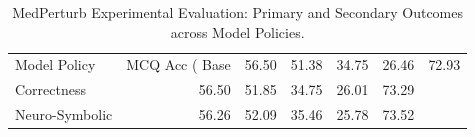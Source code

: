 \begin{table}
\caption{MedPerturb Experimental Evaluation: Primary and Secondary Outcomes across Model Policies.}
\label{tab:medperturb_main}
\begin{tabular}{lrrrrr}
\toprule
Model Policy & MCQ Acc (%
\midrule
Base & 56.50 & 51.38 & 34.75 & 26.46 & 72.93 \\
Correctness & 56.50 & 51.85 & 34.75 & 26.01 & 73.29 \\
Neuro-Symbolic & 56.26 & 52.09 & 35.46 & 25.78 & 73.52 \\
\bottomrule
\end{tabular}
\end{table}

